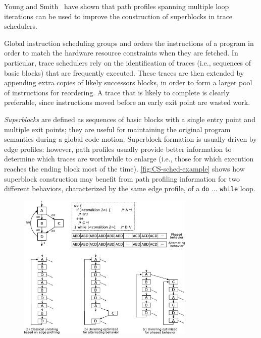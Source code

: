 Young and Smith~\cite{Young98} have shown that path profiles spanning multiple loop iterations can be used to improve the construction of superblocks in trace schedulers.

Global instruction scheduling groups and orders the instructions of a program in order to match the hardware resource constraints when they are fetched. In particular, trace schedulers rely on the identification of traces (i.e., sequences of basic blocks) that are frequently executed. These traces are then extended by appending extra copies of likely successors blocks, in order to form a larger pool of instructions for reordering. A trace that is likely to complete is clearly preferable, since instructions moved before an early exit point are wasted work.

{\em Superblocks} are defined as sequences of basic blocks with a single entry point and multiple exit points; they are useful for maintaining the original program semantics during a global code motion. Superblock formation is usually driven by edge profiles: however, path profiles usually provide better information to determine which traces are worthwhile to enlarge (i.e., those for which execution reaches the ending block most of the time). \myfigure\ref{fig:CS-sched-example} shows how superblock construction may benefit from path profiling information for two different behaviors, characterized by the same edge profile, of a {\tt do} $\ldots$ {\tt while} loop.

\ifdefined\noauthorea
\begin{figure}[!ht]
\begin{center}
\includegraphics[width=0.75\textwidth]{figures/CS-sched-example/CS-sched-example.eps}
\caption{\protect}
\end{center}
\end{figure}
\fi


